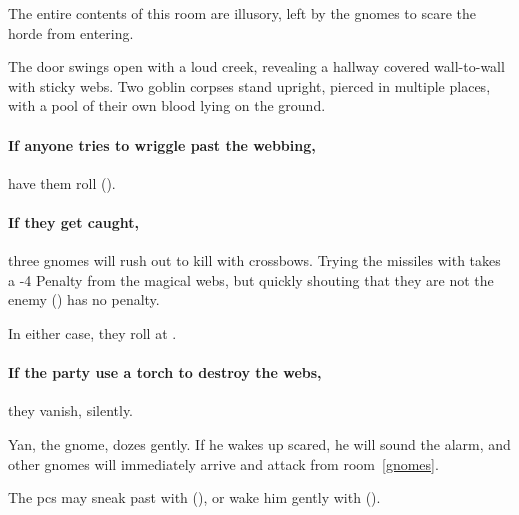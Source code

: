 \begin{multicols}{2}
{}


The entire contents of this room are illusory, left by the gnomes to scare the horde from entering.

\begin{boxtext}
  The door swings open with a loud creek, revealing a hallway covered wall-to-wall with sticky webs.
  Two goblin corpses stand upright, pierced in multiple places, with a pool of their own blood lying on the ground.
\end{boxtext}

\paragraph{If anyone tries to wriggle past the webbing,}
have them roll  (\tn[12]).

\paragraph{If they get caught,}
three gnomes will rush out to kill with crossbows.
Trying the missiles with  takes a -4 Penalty from the magical webs, but quickly shouting that they are not the enemy ()  has no penalty.

In either case, they roll at \tn[10].

\paragraph{If the party use a torch to destroy the webs,}
they vanish, silently.



Yan, the gnome, dozes gently.
If he wakes up scared, he will sound the alarm, and other gnomes will immediately arrive and attack from room~\ref{gnomes}.

The \glspl{pc} may sneak past with  (\tn[10]), or wake him gently with  (\tn[8]).



\end{multicols}
